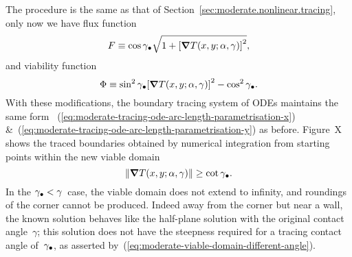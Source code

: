 The procedure is the same
as that of Section~\ref{sec:moderate.nonlinear.tracing},
only now we have flux function
\begin{equation}
  F \ideq
    \cos\tr{\gamma}
    \sqrt{1 + \squarebr[\bulkysize]{\del T (x, y; \alpha, \gamma)}^2},
  \label{eq:moderate-flux-function-different-angle}
\end{equation}
and viability function
\begin{equation}
  \Phi \ideq
    \sin^2\tr{\gamma} \squarebr[\bulkysize]{\del T (x, y; \alpha, \gamma)}^2
    - \cos^2\tr{\gamma}.
    \label{eq:moderate-viability-function-different-angle}
\end{equation}
With these modifications,
the boundary tracing system of ODEs maintains the same form~%
  (\ref{eq:moderate-tracing-ode-arc-length-parametrisation-x})
\&~(\ref{eq:moderate-tracing-ode-arc-length-parametrisation-y})
as before.
Figure~X %
shows the traced boundaries obtained by numerical integration
from starting points within the new viable domain
\begin{equation}
  \norm[\bulkysize]{\del T (x, y; \alpha, \gamma)} \ge \cot\tr{\gamma}.
  \label{eq:moderate-viable-domain-different-angle}
\end{equation}
In the $\gamma_\bullet < \gamma$~case,
the viable domain does not extend to infinity,
and roundings of the corner cannot be produced.
Indeed away from the corner but near a wall,
the known solution behaves like the half-plane solution
with the original contact angle~$\gamma$;
this solution does not have the steepness required
for a tracing contact angle of~$\gamma_\bullet$,
as asserted by~(\ref{eq:moderate-viable-domain-different-angle}).

